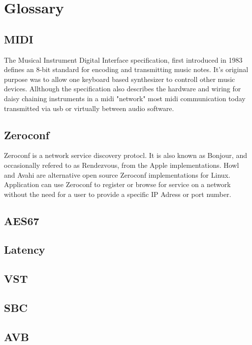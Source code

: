 \section{Glossary}

\subsection*{MIDI}
The Musical Instrument Digital Interface specification, first introduced in 1983 defines an 8-bit standard for encoding and transmitting music notes. It's original purpose was to allow one keyboard based synthesizer to controll other music devices.\cite{Boulanger:2011} Allthough the specification also describes the hardware and wiring for daisy chaining instruments in a midi "network" most midi communication today transmitted via usb or virtually between audio software.

\subsection*{Zeroconf}
Zeroconf is a network service discovery protocl. It is also known as Bonjour, and occasionally refered to as Rendezvous, from the Apple implementations. Howl and Avahi are alternative open source Zeroconf implementations for Linux. Application can use Zeroconf to register or browse for service on a network without the need for a user to provide a specific IP Adress or port number. \cite{zeroconf}

\subsection*{AES67}

\subsection*{Latency}

\subsection*{VST}
\subsection*{SBC}
\subsection*{AVB}